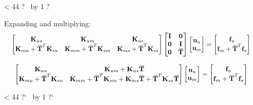\documentclass[10pt,b5paper,titlepage]{book}
\newcommand{\m}{\mathbf}
\newcommand{\closure}[2][3]{%
{}\mkern#1mu\overline{\mkern-#1mu#2}}
\newcommand{\repeatit}[3][10]{%
    \myloopcounter1%
    \loop\ifnum\myloopcounter < #1
    #2#3%
    \advance\myloopcounter by 1%
    \repeat%
    #2%
}
\newenvironment{qbox}
{
\begin{center}
    \repeatit[44]{?}{\ }
\end{center}
}
{
\begin{center}
    \repeatit[44]{?`}{\ }
\end{center}
}
\begin{document}
\begin{qbox}
    Expanding and multiplying:
    \begin{equation}
        \scalebox{0.92}{
        $ \begin{bmatrix}
            \m{K}_{uu} & \m{K}_{um} & \m{K}_{us} \\
            \m{K}_{mu} + \m{\closure{T}}^T \m{K}_{su} &
            \m{K}_{mm} + \m{\closure{T}}^T \m{K}_{sm} &
            \m{K}_{ms} + \m{\closure{T}}^T \m{K}_{ss} \\
        \end{bmatrix}
        \begin{bmatrix}
            \m{I} & \m{0} \\
            \m{0} & \m{I} \\
            \m{0} & \m{\closure{T}} \\
        \end{bmatrix}
        \begin{bmatrix}
            \m{u}_u \\
            \m{u}_m \\
        \end{bmatrix}
        = \begin{bmatrix}
            \m{f}_u \\
            \m{f}_m + \m{\closure{T}}^T \m{f}_s \\
        \end{bmatrix} $
        }
    \end{equation}

    \begin{equation}
        \scalebox{0.95}{
        $ \begin{bmatrix}
            \m{K}_{uu} & \m{K}_{um} + \m{K}_{us} \m{\closure{T}} \\
            \m{K}_{mu} + \m{\closure{T}}^T \m{K}_{su} &
            \m{K}_{mm} + \m{\closure{T}}^T \m{K}_{sm} +
            \m{K}_{ms} \m{\closure{T}} + \m{\closure{T}}^T \m{K}_{ss} \m{\closure{T}} \\
        \end{bmatrix}
        \begin{bmatrix}
            \m{u}_u \\
            \m{u}_m \\
        \end{bmatrix}
        = \begin{bmatrix}
            \m{f}_u \\
            \m{f}_m + \m{\closure{T}}^T \m{f}_s \\
        \end{bmatrix} $
        }
    \end{equation}


\end{qbox}
\end{document}
